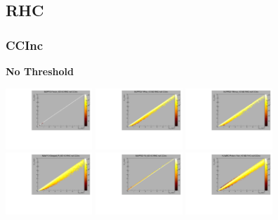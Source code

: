 \subsection{RHC}

\subsubsection{CCInc}

\textbf{No Threshold}

\begin{center}

  \includegraphics[width=0.245\textwidth]{plots/response_matrix/Proton_KE_RHC_CCInc_null.pdf}
  \includegraphics[width=0.245\textwidth]{plots/response_matrix/PiPlus_KE_RHC_CCInc_null.pdf}
  \includegraphics[width=0.245\textwidth]{plots/response_matrix/PiMinus_KE_RHC_CCInc_null.pdf}
  \includegraphics[width=0.245\textwidth]{plots/response_matrix/Charged_Pi_KE_RHC_CCInc_null.pdf}
  \includegraphics[width=0.245\textwidth]{plots/response_matrix/Pi0_KE_RHC_CCInc_null.pdf}
  \includegraphics[width=0.245\textwidth]{plots/response_matrix/Proton+Pion_KE_RHC_CCInc_null.pdf}

\end{center}
